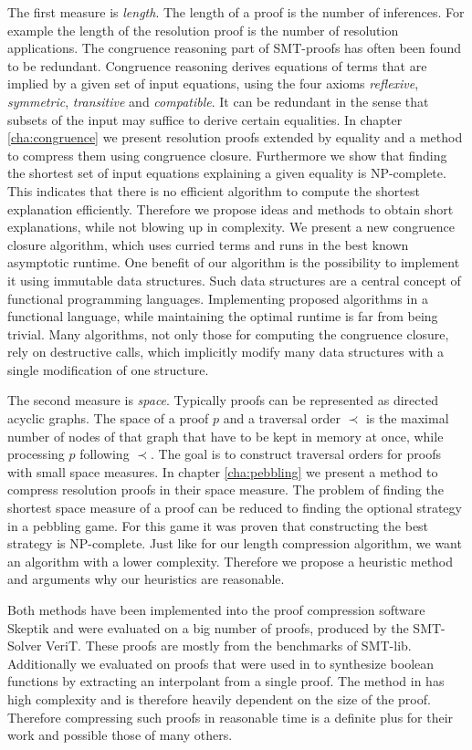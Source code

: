 The first measure is \emph{length}.
The length of a proof is the number of inferences.
For example the length of the resolution proof is the number of resolution applications.
The congruence reasoning part of SMT-proofs has often been found to be redundant.
Congruence reasoning derives equations of terms that are implied by a given set of input equations, 
using the four axioms \emph{reflexive}, \emph{symmetric}, \emph{transitive} and \emph{compatible}. 
It can be redundant in the sense that subsets of the input may suffice to derive certain equalities.
In chapter \ref{cha:congruence} we present resolution proofs extended by equality and a method to compress them using congruence closure.
Furthermore we show that finding the shortest set of input equations explaining a given equality is NP-complete.
This indicates that there is no efficient algorithm to compute the shortest explanation efficiently.
Therefore we propose ideas and methods to obtain short explanations, while not blowing up in complexity.
We present a new congruence closure algorithm, which uses curried terms and runs in the best known asymptotic runtime.
One benefit of our algorithm is the possibility to implement it using immutable data structures.
Such data structures are a central concept of functional programming languages.
Implementing proposed algorithms in a functional language, while maintaining the optimal runtime is far from being trivial.
Many algorithms, not only those for computing the congruence closure, rely on destructive calls, which implicitly modify many data structures with a single modification of one structure. 

The second measure is \emph{space}.
Typically proofs can be represented as directed acyclic graphs.
The space of a proof $p$ and a traversal order $\prec$ is the maximal number of nodes of that graph that have to be kept in memory at once, while processing $p$ following $\prec$.
The goal is to construct traversal orders for proofs with small space measures.
In chapter \ref{cha:pebbling} we present a method to compress resolution proofs in their space measure.
The problem of finding the shortest space measure of a proof can be reduced to finding the optional strategy in a pebbling game.
For this game it was proven that constructing the best strategy is NP-complete.
Just like for our length compression algorithm, we want an algorithm with a lower complexity.
Therefore we propose a heuristic method and arguments why our heuristics are reasonable.

Both methods have been implemented into the proof compression software Skeptik and were evaluated on a big number of proofs, produced by the SMT-Solver VeriT.
These proofs are mostly from the benchmarks of SMT-lib.
Additionally we evaluated on proofs that were used in \cite{Hofferek2013} to synthesize boolean functions by extracting an interpolant from a single proof.
The method in \cite{Hofferek2013} has high complexity and is therefore heavily dependent on the size of the proof.
Therefore compressing such proofs in reasonable time is a definite plus for their work and possible those of many others.
